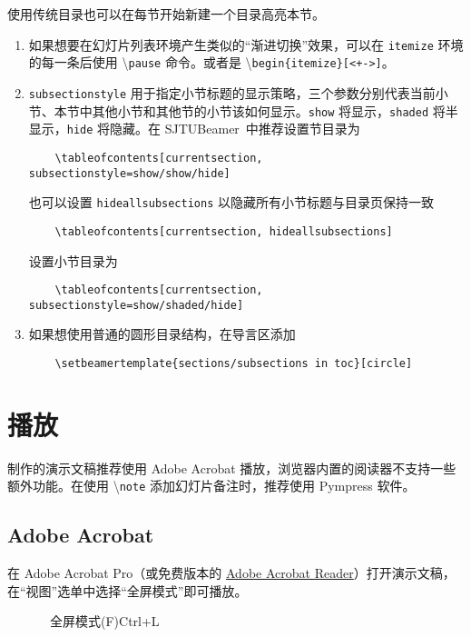 \documentclass[
    UTF8,
    heading=true,
    12pt,
    a4paper
]{ctexrep}
\newenvironment{commentlist}{\begin{enumerate}\small}{\end{enumerate}}
\newcommand{\cmd}[1]{\textbackslash{}\texttt{#1}}
\newcommand{\opt}[1]{\texttt{#1}}
\def\themename{\textsf{SJTUBeamer}}
\begin{document}
使用传统目录也可以在每节开始新建一个目录高亮本节。


\begin{commentlist}
  \item 如果想要在幻灯片列表环境产生类似的“渐进切换”效果，可以在 \texttt{itemize} 环境的每一条后使用 \cmd{pause} 命令。或者是 \cmd{begin\{itemize\}[<+->]}。
  \item \opt{subsectionstyle} 用于指定小节标题的显示策略，三个参数分别代表当前小节、本节中其他小节和其他节的小节该如何显示。\opt{show} 将显示，\opt{shaded} 将半显示，\opt{hide} 将隐藏。在 \themename\ 中推荐设置节目录为
  \begin{verbatim}
    \tableofcontents[currentsection, subsectionstyle=show/show/hide]
  \end{verbatim}
  也可以设置 \opt{hideallsubsections} 以隐藏所有小节标题与目录页保持一致
  \begin{verbatim}
    \tableofcontents[currentsection, hideallsubsections]
  \end{verbatim}
  设置小节目录为
  \begin{verbatim}
    \tableofcontents[currentsection, subsectionstyle=show/shaded/hide]
  \end{verbatim}
  \item 如果想使用普通的圆形目录结构，在导言区添加\begin{verbatim}
    \setbeamertemplate{sections/subsections in toc}[circle]
  \end{verbatim}
\end{commentlist}

\chapter{播放}

制作的演示文稿推荐使用 Adobe Acrobat 播放，浏览器内置的阅读器不支持一些额外功能。在使用 \cmd{note} 添加幻灯片备注时，推荐使用 Pympress 软件。

\section{Adobe Acrobat}

在 Adobe Acrobat Pro（或免费版本的 \href{https://www.adobe.com/cn/acrobat/pdf-reader.html}{Adobe Acrobat Reader}）打开演示文稿，在“视图”选单中选择“全屏模式”即可播放。

\begin{figure}[h]
  \centering
  \begin{tcolorbox}[enhanced, title={视图(V)}, attach boxed title to top left, boxed title style={sharp corners}, sharp corners, tile, width=6cm]
    \faTv\ 全屏模式(F)\hfill Ctrl+L
  \end{tcolorbox}
\end{figure}
\end{document}
